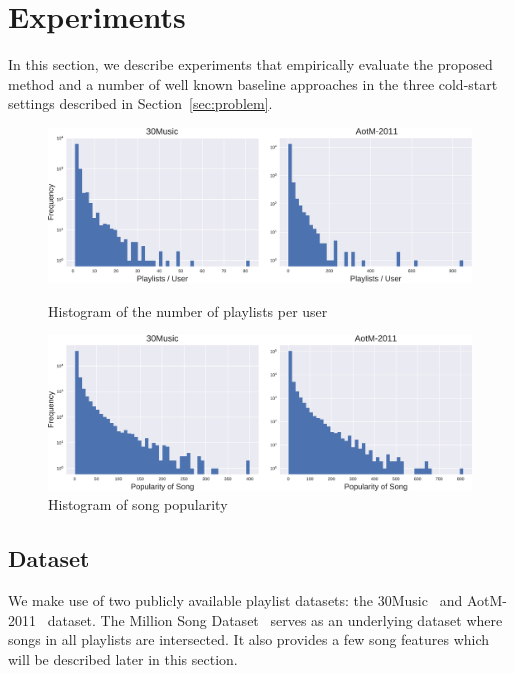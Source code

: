 \section{Experiments}
\label{sec:experiment}

In this section, we describe experiments that empirically evaluate the proposed method and a number of 
well known baseline approaches in the three cold-start settings described in Section~\ref{sec:problem}.

\begin{figure}[!t]
    \centering
    \begin{minipage}{.5\textwidth}
        \centering
        \includegraphics[width=.95\linewidth]{fig/hist_pluser.pdf}
        \caption{Histogram of the number of playlists per user}
        \label{fig:hist_pluser}
    \end{minipage}%
    \begin{minipage}{0.5\textwidth}
        \centering
        \includegraphics[width=.95\linewidth]{fig/hist_songpop.pdf}
        \caption{Histogram of song popularity}
        \label{fig:hist_songpop}
    \end{minipage}
\end{figure}


\subsection{Dataset}
We make use of two publicly available playlist datasets: the 30Music~\cite{30music2015} and AotM-2011~\cite{mcfee2012hypergraph} dataset.
The Million Song Dataset~\cite{msd2011} serves as an underlying dataset where songs in all playlists are intersected.
It also provides a few song features which will be described later in this section.



